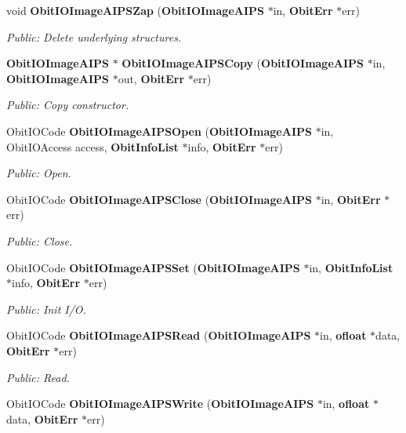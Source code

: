 \begin{CompactItemize}
void {\bf Obit\-IOImage\-AIPSZap} ({\bf Obit\-IOImage\-AIPS} $\ast$in, {\bf Obit\-Err} $\ast$err)
\begin{CompactList}\small\item\em Public: Delete underlying structures. \item\end{CompactList}\item 
{\bf Obit\-IOImage\-AIPS} $\ast$ {\bf Obit\-IOImage\-AIPSCopy} ({\bf Obit\-IOImage\-AIPS} $\ast$in, {\bf Obit\-IOImage\-AIPS} $\ast$out, {\bf Obit\-Err} $\ast$err)
\begin{CompactList}\small\item\em Public: Copy constructor. \item\end{CompactList}\item 
Obit\-IOCode {\bf Obit\-IOImage\-AIPSOpen} ({\bf Obit\-IOImage\-AIPS} $\ast$in, Obit\-IOAccess access, {\bf Obit\-Info\-List} $\ast$info, {\bf Obit\-Err} $\ast$err)
\begin{CompactList}\small\item\em Public: Open. \item\end{CompactList}\item 
Obit\-IOCode {\bf Obit\-IOImage\-AIPSClose} ({\bf Obit\-IOImage\-AIPS} $\ast$in, {\bf Obit\-Err} $\ast$err)
\begin{CompactList}\small\item\em Public: Close. \item\end{CompactList}\item 
Obit\-IOCode {\bf Obit\-IOImage\-AIPSSet} ({\bf Obit\-IOImage\-AIPS} $\ast$in, {\bf Obit\-Info\-List} $\ast$info, {\bf Obit\-Err} $\ast$err)
\begin{CompactList}\small\item\em Public: Init I/O. \item\end{CompactList}\item 
Obit\-IOCode {\bf Obit\-IOImage\-AIPSRead} ({\bf Obit\-IOImage\-AIPS} $\ast$in, {\bf ofloat} $\ast$data, {\bf Obit\-Err} $\ast$err)
\begin{CompactList}\small\item\em Public: Read. \item\end{CompactList}\item 
Obit\-IOCode {\bf Obit\-IOImage\-AIPSWrite} ({\bf Obit\-IOImage\-AIPS} $\ast$in, {\bf ofloat} $\ast$data, {\bf Obit\-Err} $\ast$err)

\end{CompactItemize}
